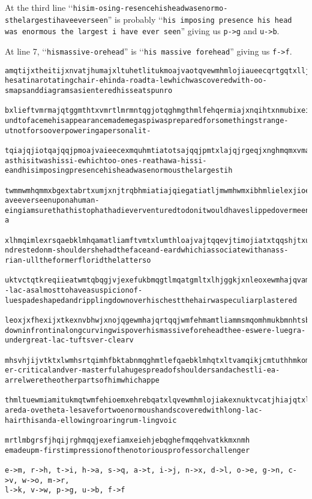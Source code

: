 At the third line
\lq\lq\texttt{hisim-osing-resencehisheadwasenormo-sthelargestihaveeverseen}''
is probably
\lq\lq\texttt{his imposing presence his head was enormous the largest i have ever seen}''
giving us \verb!p->g! and \verb!u->b!.

At line 7,
\lq\lq\texttt{hismassive-orehead}'' is \lq\lq\texttt{his massive forehead}'' giving us \verb!f->f!.

  \begin{Verbatim}[frame=single,fontsize=\tiny]
amqtijxtheitijxnvatjhumajxltuhetlitukmoajvaotqvewmhmlojiaueecqrtgqtxlljtnhtrqtqjmximhmlajqqmtiqgbxhe
hesatinarotatingchair-ehinda-roadta-lewhichwascoveredwith-oo-smapsanddiagramsasienteredhisseatspunro

bxlieftvmrmajqtggmthtxvmrtlmrmntqgjotqghmgthmlfehqermiajxnqihtxnmubixeifehqeewmhgeomhjxntgmhqextkjis
undtofacemehisappearancemademegaspiwaspreparedforsomethingstrange-utnotforsooverpoweringapersonalit-

tqiajqjiotqajqqjpmoajvaieecexmquhmtiatotsajqqjpmtxlajqjrgeqjxnghmqmxvmajqamtlotqmxehrebqiamkthnmqija
asthisitwashissi-ewhichtoo-ones-reathawa-hissi-eandhisimposingpresencehisheadwasenormousthelargestih

twmmwmhqmmxbgextabrtxumjxnjtrqbhmiatiajqiegatiatljmwmhwmxibhmlielexjioebklatwmqkjggmlewmhrmmxijhmkst
aveeverseenuponahuman-eingiamsurethathistophathadieverventuredtodonitwouldhaveslippedovermeentirel-a

xlhmqimlexrsqaebklmhqamatliamftvmtxlumthloajvajtqqevjtimojiatxtqqshjtxubkkiamfehrmhfkehjliamktiimhqe
ndrestedonm-shouldershehadthefaceand-eardwhichiassociatewithanass-rian-ulltheformerfloridthelatterso

uktvctqtkreqiieatwmtqbqgjvjexefukbmqgtlmqatgmltxlhjggkjxnleoxewmhajqvamqiiamatjhotqgmvbkjthgktqimhml
-lac-asalmosttohaveasuspicionof-luespadeshapedandripplingdownoverhischestthehairwaspeculiarplastered

leoxjxfhexijxtkexnvbhwjxnojqgewmhajqrtqqjwmfehmamtliammsmqomhmukbmnhtsbxlmhnhmtiuktvcibfiqwmhsvkmthw
downinfrontinalongcurvingwispoverhismassiveforeheadthee-eswere-luegra-undergreat-lac-tuftsver-clearv

mhsvhjijvtktxlwmhsrtqimhfbktabnmqghmtlefqaebklmhqtxltvamqikjcmtuthhmkomhmiameiamhgthiqefajroajvatggm
er-criticalandver-masterfulahugespreadofshouldersandachestli-ea-arrelweretheotherpartsofhimwhichappe

thmltuewmiamitukmqtwmfehioemxehrebqatxlqvewmhmlojiakexnuktvcatjhiajqtxltumkkeojxnhethjxnhbrukjxnwejv
areda-ovetheta-lesavefortwoenormoushandscoveredwithlong-lac-hairthisanda-ellowingroaringrum-lingvoic

mrtlmbgrsfjhqijrghmqqjexefiamxeiehjebqghefmqqehvatkkmxnmh
emadeupm-firstimpressionofthenotoriousprofessorchallenger

e->m, r->h, t->i, h->a, s->q, a->t, i->j, n->x, d->l, o->e, g->n, c->v, w->o, m->r,
l->k, v->w, p->g, u->b, f->f
\end{Verbatim}

